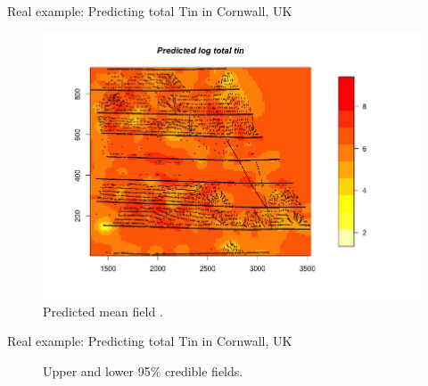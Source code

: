 \documentclass{beamer}
\begin{document}
\begin{frame}{Real example: Predicting total Tin in Cornwall, UK}
\begin{figure}
\centering
\caption{Predicted mean field .\label{fig:predictLogTin}}
\includegraphics[scale = 0.35]{Images/PredictedLogTin.jpeg}
\end{figure}

\end{frame}

\begin{frame}{Real example: Predicting total Tin in Cornwall, UK}

\begin{figure}
\centering
\caption{Upper and lower 95\% credible fields.\label{fig:credFields}}
\end{figure}


\end{frame}
\end{document}
